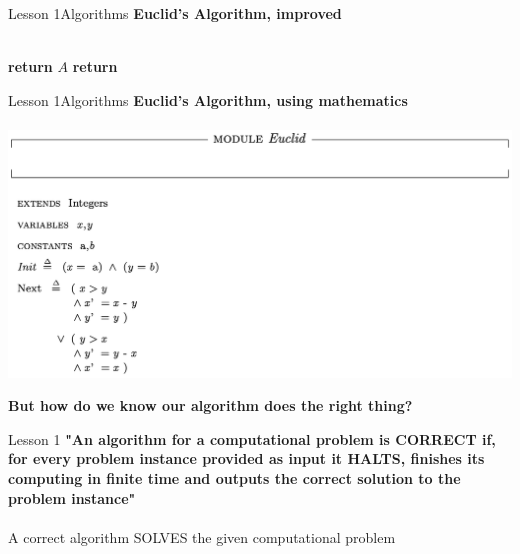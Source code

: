 \documentclass[aspectratio=1610]{beamer}
\begin{document}
\begin{frame}{Lesson 1}{Algorithms}
\Large
\textbf{Euclid's Algorithm, improved}\\~\\

\label{Euclid}
\begin{algorithmic}[1]
    \State \textbf{return} $A$
\Else \State \textbf{return} 
\EndIf
\EndProcedure
\end{algorithmic}
\end{frame}



\begin{frame}{Lesson 1}{Algorithms}
\Large
\textbf{Euclid's Algorithm, using mathematics}\\~\\
\includegraphics[scale=0.5]{Images/gcdtla}
\end{frame}


\begin{frame}
\begin{center}
\Huge 
\textbf {But how do we know our algorithm does the right thing?}
\end{center}
\end{frame}


\begin{frame}{Lesson 1}{}
\LARGE
\textbf {"An algorithm for a computational problem is CORRECT if, for every problem instance provided as input it HALTS, finishes its computing  in finite time and outputs the correct solution to the problem instance"\\~\\}
A correct algorithm SOLVES the given computational problem

\end{frame}
\end{document}
